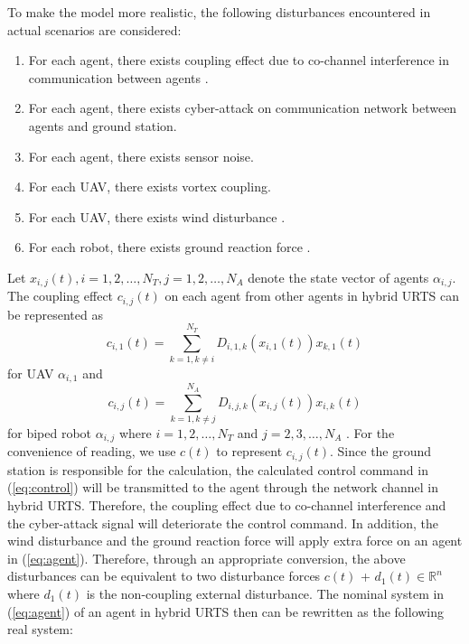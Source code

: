 \documentclass{ieeeaccess}
\begin{document}
To make the model more realistic, the following disturbances encountered in actual scenarios are considered:
\begin{enumerate}
    \item For each agent, there exists coupling effect due to co-channel interference in communication between agents \cite{9834947}.
    \item For each agent, there exists cyber-attack on communication network between agents and ground station.
    \item For each agent, there exists sensor noise.
    \item For each UAV, there exists vortex coupling.
    \item For each UAV, there exists wind disturbance \cite{9075385}.
    \item For each robot, there exists ground reaction force \cite{chen2013human}. 
\end{enumerate}
Let $x_{i,j}(t), i=1,2,\dots,N_T, j=1,2,\dots,N_A$ denote the state vector of agents $\alpha_{i,j}$. The coupling effect $c_{i,j}(t)$ on each agent from other agents in hybrid URTS can be represented as \begin{equation} \label{eq:UAV couple}
    c_{i,1}(t) = \sum_{k = 1, k \neq i}^{N_T}D_{i, 1, k}(x_{i, 1}(t))x_{k, 1}(t)
\end{equation} for UAV $\alpha_{i, 1}$ and \begin{equation} \label{eq:robot couple}
    c_{i,j}(t) = \sum_{k = 1, k \neq j}^{N_A}D_{i, j, k}(x_{i, j}(t))x_{i, k}(t)
\end{equation} for biped robot $\alpha_{i, j}$ where $i=1,2,\dots,N_T$ and $j=2,3,\dots,N_A$ \cite{9834947}. For the convenience of reading, we use $c(t)$ to represent $c_{i,j}(t)$. Since the ground station is responsible for the calculation, the calculated control command in (\ref{eq:control}) will be transmitted to the agent through the network channel in hybrid URTS. Therefore, the coupling effect due to co-channel interference and the cyber-attack signal will deteriorate the control command. In addition, the wind disturbance and the ground reaction force will apply extra force on an agent in (\ref{eq:agent}). Therefore, through an appropriate conversion, the above disturbances can be equivalent to two disturbance forces $c(t)$ + $d_1(t)\in\mathbb{R}^n$ where $d_1(t)$ is the non-coupling external disturbance. The nominal system in (\ref{eq:agent}) of an agent in hybrid URTS then can be rewritten as the following real system:
\end{document}
